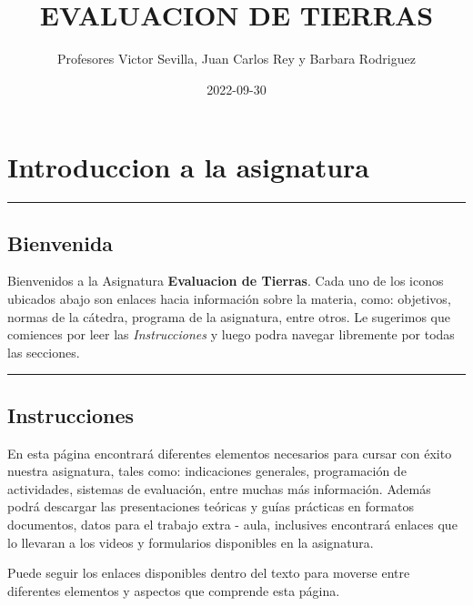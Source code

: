 \documentclass[
]{book}
\title{EVALUACION DE TIERRAS}
\author{Profesores Victor Sevilla, Juan Carlos Rey y Barbara Rodriguez}
\date{2022-09-30}
\begin{document}
\maketitle

{
\setcounter{tocdepth}{1}
\tableofcontents
}
\hypertarget{introduccion-a-la-asignatura}{%
\chapter{Introduccion a la asignatura}\label{introduccion-a-la-asignatura}}

\begin{center}\rule{0.5\linewidth}{0.5pt}\end{center}

\hypertarget{bienvenida}{%
\section*{Bienvenida}\label{bienvenida}}

Bienvenidos a la Asignatura \textbf{Evaluacion de Tierras}. Cada uno de los iconos ubicados abajo son enlaces hacia información sobre la materia, como: objetivos, normas de la cátedra, programa de la asignatura, entre otros. Le sugerimos que comiences por leer las \emph{Instrucciones} y luego podra navegar libremente por todas las secciones.

\begin{center}\rule{0.5\linewidth}{0.5pt}\end{center}

\hypertarget{instrucciones}{%
\section*{Instrucciones}\label{instrucciones}}

En esta página encontrará diferentes elementos necesarios para cursar con éxito nuestra asignatura, tales como: indicaciones generales, programación de actividades, sistemas de evaluación, entre muchas más información. Además podrá descargar las presentaciones teóricas y guías prácticas en formatos documentos, datos para el trabajo extra - aula, inclusives encontrará enlaces que lo llevaran a los videos y formularios disponibles en la asignatura.

Puede seguir los enlaces disponibles dentro del texto para moverse entre diferentes elementos y aspectos que comprende esta página.
\end{document}
